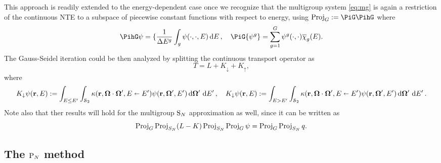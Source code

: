 \begin{remark}
	This approach is readily extended to the energy-dependent case once we recognize that the multigroup system
	\eqref{eq:mg} is again a restriction of the continuous NTE to a subspace of piecewise constant functions with respect
	to energy, using $\Projop[G] := \PiG\PihG$ where
	$$
		\PihG\psi = \{\frac{1}{\Delta E^{g}}\int_{g}\psi(\cdot,\cdot,E)\,\d{E},\quad
		\PiG\{\psi^g\} = \sum_{g=1}^G \psi^g(\cdot,\cdot)\overline\chi_g(E).
	$$
	The Gauss-Seidel iteration could be then analyzed by splitting the continuous transport operator as
	$$
		T = L + K_\downarrow + K_\uparrow,
	$$
	where
	$$
		K_\downarrow\psi(\br,E) := \intE[']{E \leq E'}{}{
		\intA[']{\kappa(\br,\bomega\cdot\bomega',E\sla E')\psi(\br,\bomega',E')}},\quad
		K_\downarrow\psi(\br,E) := \intE[']{E > E'}{}{
		\intA[']{\kappa(\br,\bomega\cdot\bomega',E\sla E')\psi(\br,\bomega',E')}}.
	$$
	Note also that ther results will hold for the multigroup $\SN$ approximation as well, since it can be written as 
	$$
	\Projop[G]\Projop[S_N] (\op{L} - \op{K})\Projop[S_N]\Projop[G] \psi = \Projop[G]\Projop[S_N] q. 
	$$
\end{remark}





\subsection{The $\PN$ method}\label{sec:PN}

